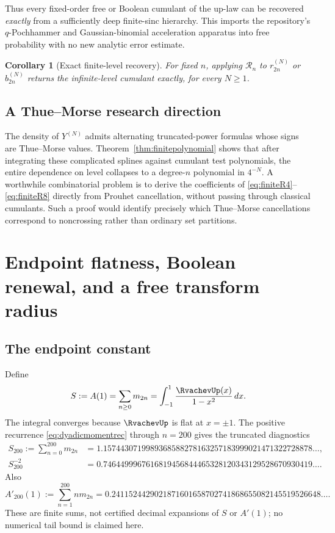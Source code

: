 \documentclass[11pt,oneside]{article}
\newtheorem{corollary}[theorem]{Corollary}
\theoremstyle{definition}
\theoremstyle{remark}
\begin{document}
Thus every fixed-order free or Boolean cumulant of the up-law can be recovered \emph{exactly} from a sufficiently deep finite-sinc hierarchy. This imports the repository's \(q\)-Pochhammer and Gaussian-binomial acceleration apparatus into free probability with no new analytic error estimate.

\begin{corollary}[Exact finite-level recovery]\label{cor:exactrecovery}
For fixed \(n\), applying \(\mathcal R_n\) to \(r_{2n}^{(N)}\) or \(b_{2n}^{(N)}\) returns the infinite-level cumulant exactly, for every \(N\ge1\).
\end{corollary}

\subsection{A Thue--Morse research direction}
The density of \(Y^{(N)}\) admits alternating truncated-power formulas whose signs are Thue--Morse values. Theorem~\ref{thm:finitepolynomial} shows that after integrating these complicated splines against cumulant test polynomials, the entire dependence on level collapses to a degree-\(n\) polynomial in \(4^{-N}\). A worthwhile combinatorial problem is to derive the coefficients of \eqref{eq:finiteR4}--\eqref{eq:finiteR8} directly from Prouhet cancellation, without passing through classical cumulants. Such a proof would identify precisely which Thue--Morse cancellations correspond to noncrossing rather than ordinary set partitions.

\section{Endpoint flatness, Boolean renewal, and a free transform radius}
\subsection{The endpoint constant}
Define
\begin{equation}\label{eq:Sconstant}
S:=A(1)=\sum_{n\ge0}m_{2n}
=\int_{-1}^1\frac{\RvachevUp(x)}{1-x^2}\,dx.
\end{equation}
The integral converges because \(\RvachevUp\) is flat at \(x=\pm1\).  The positive
recurrence \eqref{eq:dyadicmomentrec} through \(n=200\) gives the truncated
diagnostics
\begin{align}
S_{200}:=\sum_{n=0}^{200}m_{2n}
&=1.1574430719989368588278163257183999021471322728878\ldots,
\label{eq:Svalue}\\
S_{200}^{-2}&=0.7464499967616819456844465328120343129528670930419\ldots.
\label{eq:Sinv2}
\end{align}
Also
\begin{equation}\label{eq:Aprime}
A'_{200}(1):=\sum_{n=1}^{200}nm_{2n}
=0.2411524429021871601658702741868655082145519526648\ldots.
\end{equation}
These are finite sums, not certified decimal expansions of \(S\) or
\(A'(1)\); no numerical tail bound is claimed here.
\end{document}
